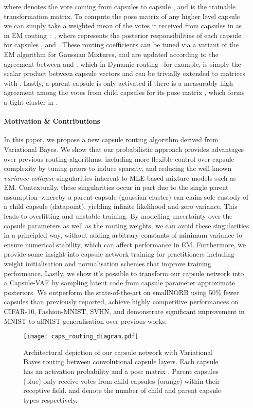 \documentclass[letterpaper]{article} \usepackage{aaai20}  \usepackage{times}  \usepackage{helvet} \usepackage{courier}  \usepackage[hyphens]{url}  \usepackage{graphicx} \urlstyle{rm} \def\UrlFont{\rm}  \usepackage{graphicx}  \frenchspacing  \setlength{\pdfpagewidth}{8.5in}  \setlength{\pdfpageheight}{11in}  \nocopyright
\begin{document}
where  denotes the vote coming from capsules  to capsule , and  is the trainable transformation matrix. To compute the pose matrix  of any higher level capsule  we can simply take a weighted mean of the votes it received from capsules in  as in EM routing~\cite{hinton2018matrix}: , where  represents the posterior responsibilities of each capsule  for capsules , and . These routing coefficients can be tuned via a variant of the EM algorithm for Gaussian Mixtures, and are updated according to the agreement between  and , which in Dynamic routing~\cite{sabour2017dynamic} for example, is simply the scalar product between capsule vectors and can be trivially extended to matrices with . Lastly, a parent capsule  is only activated if there is a measurably high agreement among the votes  from child capsules  for its pose matrix , which forms a tight cluster in .
\paragraph{Motivation \& Contributions}
In this paper, we propose a new capsule routing algorithm derived from Variational Bayes. We show that our probabilistic approach provides advantages over previous routing algorithms, including more flexible control over capsule complexity by tuning priors to induce sparsity, and reducing the well known \textit{variance-collapse} singularities inherent to MLE based mixture models such as EM. Contextually, these singularities occur in part due to the single parent assumption--whereby a parent capsule (gaussian cluster) can claim sole custody of a child capsule (datapoint), yielding infinite likelihood and zero variance. This leads to overfitting and unstable training. By modelling uncertainty over the capsule parameters as well as the routing weights, we can avoid these singularities in a principled way, without adding arbitrary constants of minimum variance to ensure numerical stability, which can affect performance in EM. Furthermore, we provide some insight into capsule network training for practitioners including weight initialisation and normalisation schemes that improve training performance. Lastly, we show it's possible to transform our capsule network into a Capsule-VAE by sampling latent code from capsule parameter approximate posteriors. We outperform the state-of-the-art on smallNORB using 50\% fewer capsules than previously reported, achieve highly competitive performances on CIFAR-10, Fashion-MNIST, SVHN, and demonstrate significant improvement in MNIST to affNIST generalisation over previous works.
\begin{figure*}[t]
    \centering
    \texttt{[image: caps\_routing\_diagram.pdf]}
 \caption{Architectural depiction of our capsule network with Variational Bayes routing between convolutional capsule layers. Each capsule has an activation probability  and a pose matrix . Parent capsules  (blue) only receive votes from child capsules  (orange) within their receptive field.  and  denote the number of child and parent capsule types respectively.}
\label{big_diagram}
\end{figure*}  
\end{document}
